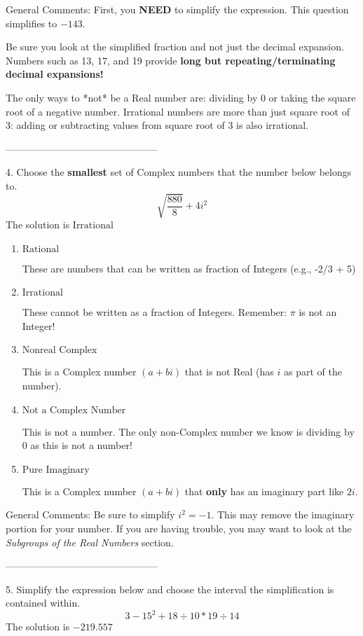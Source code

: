 \documentclass{extbook}[14pt]
\begin{document}
General Comments: First, you \textbf{NEED} to simplify the expression. This question simplifies to $-143$. 
 
 Be sure you look at the simplified fraction and not just the decimal expansion. Numbers such as 13, 17, and 19 provide \textbf{long but repeating/terminating decimal expansions!} 
 
 The only ways to *not* be a Real number are: dividing by 0 or taking the square root of a negative number. Irrational numbers are more than just square root of 3: adding or subtracting values from square root of 3 is also irrational.

-----------------------------------------------

4. Choose the \textbf{smallest} set of Complex numbers that the number below belongs to.
\[ \sqrt{\frac{880}{8}}+4i^2 \] 
The solution is $ \text{Irrational} $ 

\begin{enumerate}[label=\Alph*.] 
\item $ \text{Rational} $ 

 These are numbers that can be written as fraction of Integers (e.g., -2/3 + 5) 
\item $ \text{Irrational} $ 

 These cannot be written as a fraction of Integers. Remember: $\pi$ is not an Integer! 
\item $ \text{Nonreal Complex} $ 

 This is a Complex number $(a+bi)$ that is not Real (has $i$ as part of the number). 
\item $ \text{Not a Complex Number} $ 

 This is not a number. The only non-Complex number we know is dividing by 0 as this is not a number! 
\item $ \text{Pure Imaginary} $ 

 This is a Complex number $(a+bi)$ that \textbf{only} has an imaginary part like $2i$. 
\end{enumerate} 
 
General Comments: Be sure to simplify $i^2 = -1$. This may remove the imaginary portion for your number. If you are having trouble, you may want to look at the \textit{Subgroups of the Real Numbers} section.

-----------------------------------------------

5. Simplify the expression below and choose the interval the simplification is contained within.
\[ 3 - 15^2 + 18 \div 10 * 19 \div 14 \] 
The solution is $ -219.557 $ 
\end{document}
